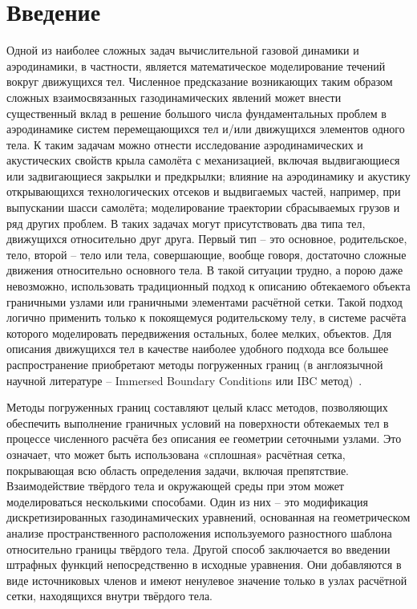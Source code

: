 \chapter*{Введение}                         %
	Одной из наиболее сложных задач вычислительной газовой динамики и аэродинамики, в частности, является математическое моделирование течений вокруг движущихся тел. Численное предсказание возникающих таким образом сложных взаимосвязанных газодинамических явлений может внести существенный вклад в решение большого числа фундаментальных проблем в аэродинамике систем перемещающихся тел и/или движущихся элементов одного тела. К таким задачам можно отнести исследование аэродинамических и акустических свойств крыла самолёта с механизацией, включая выдвигающиеся или задвигающиеся закрылки и предкрылки; влияние на аэродинамику и акустику открывающихся технологических отсеков и выдвигаемых частей, например, при выпускании шасси самолёта; моделирование траектории сбрасываемых грузов и ряд других проблем. В таких задачах могут присутствовать два типа тел, движущихся относительно друг друга. Первый тип – это основное, родительское, тело, второй – тело или тела, совершающие, вообще говоря, достаточно сложные движения относительно основного тела. В такой ситуации трудно, а порою даже невозможно, использовать традиционный подход к описанию обтекаемого объекта граничными узлами или граничными элементами расчётной сетки. Такой подход логично применить только к покоящемуся родительскому телу, в системе расчёта которого моделировать передвижения остальных, более мелких, объектов. Для описания движущихся тел в качестве наиболее удобного подхода все большее распространение приобретают методы погруженных границ (в англоязычной научной литературе – Immersed Boundary Conditions или IBC метод)~\cite{mittal2005immersed, boiron2009high, brown2014characteristic}.

	Методы погруженных границ составляют целый класс методов, позволяющих обеспечить выполнение граничных условий на поверхности обтекаемых тел в процессе численного расчёта без описания ее геометрии сеточными узлами. Это означает, что может быть использована «сплошная» расчётная сетка, покрывающая всю область определения задачи, включая препятствие. Взаимодействие твёрдого тела и окружающей среды при этом может моделироваться несколькими способами. Один из них – это модификация дискретизированных газодинамических уравнений, основанная на геометрическом анализе пространственного расположения используемого разностного шаблона относительно границы твёрдого тела. Другой способ заключается во введении штрафных функций непосредственно в исходные уравнения. Они добавляются в виде источниковых членов и имеют ненулевое значение только в узлах расчётной сетки, находящихся внутри твёрдого тела.

